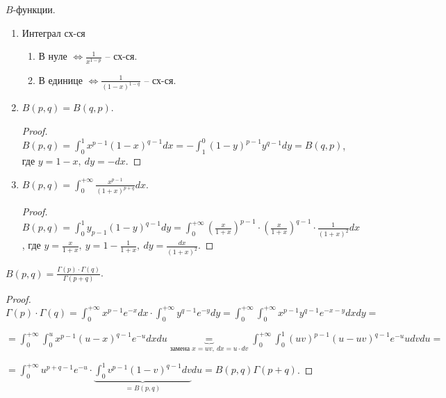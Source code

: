 \begin{properties}
    $B$-функции.

    \begin{enumerate}
        \item {
            Интеграл сх-ся 

            \begin{enumerate}
                \item В нуле $\Leftrightarrow \frac{1}{x^{1-p}}$ -- сх-ся.
                \item В единице $\Leftrightarrow \frac{1}{(1-x)^{1-q}}$ -- сх-ся.
            \end{enumerate}
        }
        \item {
            $B(p, q) = B(q, p)$.

            \begin{proof}
                $B(p, q) = \int_{0}^{1} { x^{p-1} (1-x)^{q-1} dx } = - \int_{1}^{0} { (1-y)^{p-1} y^{q-1} dy } = B(q, p)$, где $y = 1 - x, \ dy = -dx$.
            \end{proof}
        }
        \item {
            $B(p, q) = \int_{0}^{+\infty} { \frac{x^{p-1}}{(1+x)^{p+q}} dx }$.

            \begin{proof}
                $B(p, q) = \int_{0}^{1} { y_{p-1} (1-y)^{q-1} dy } = \int_{0}^{+\infty} { \left( \frac{x}{1+x} \right)^{p-1} \cdot \left( \frac{x}{1+x} \right)^{q-1} \cdot \frac{1}{(1+x)^2} dx }$, где $y = \frac{x}{1+x}, \ y = 1 - \frac{1}{1+x}, \ dy = \frac{dx}{(1+x)^2}$.
            \end{proof}
        }
    \end{enumerate}
\end{properties}

\begin{theorem}
    $B(p, q) = \frac{\Gamma(p) \cdot \Gamma(q)}{\Gamma(p+q)}$.
\end{theorem}
\begin{proof}
    $\Gamma(p) \cdot \Gamma(q) = \int_{0}^{+\infty} { x^{p-1} e^{-x} dx } \cdot \int_{0}^{+\infty} { y^{q-1} e^{-y} dy } = \int_0^{+\infty} { \int_{0}^{+\infty} { x^{p-1} y^{q-1} e^{-x-y} dx } dy } =$
    
    $= \int_{0}^{+\infty} { \int_{0}^{u} { x^{p-1} (u - x)^{q-1} e^{-u} dx } du } \underbrace{=}_{\text {замена } x = uv, \ dx = u \cdot dv} \int_{0}^{+\infty} { \int_{0}^{1} { (uv)^{p-1} (u - uv)^{q-1} e^{-u} u dv } du } =$
    
    $= \int_{0}^{+\infty} { u^{p+q-1} e^{-u} \cdot \underbrace{\int_{0}^{1} { v^{p-1} (1-v)^{q-1} dv }}_{= B(p, q)} du } = B(p, q) \Gamma(p + q)$.
\end{proof}

